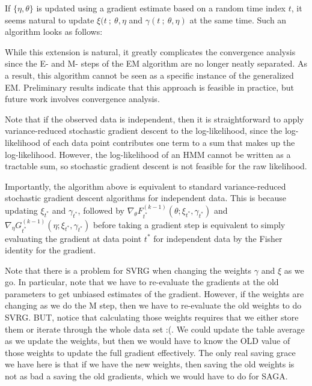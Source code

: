 If $\{\eta,\theta\}$ is updated using a gradient estimate based on a random time index $t$, it seems natural to update $\xi(t ~;~ \theta,\eta$ and $\gamma(t ~;~ \theta,\eta)$ at the same time. Such an algorithm looks as follows:

While this extension is natural, it greatly complicates the convergence analysis since the E- and M- steps of the EM algorithm are no longer neatly separated. As a result, this algorithm cannot be seen as a specific instance of the generalized EM. Preliminary results indicate that this approach is feasible in practice, but future work involves convergence analysis.

Note that if the observed data is independent, then it is straightforward to apply variance-reduced stochastic gradient descent to the log-likelihood, since the log-likelihood of each data point contributes one term to a sum that makes up the log-likelihood. However, the log-likelihood of an HMM cannot be written as a tractable sum, so stochastic gradient descent is not feasible for the raw likelihood. 

Importantly, the algorithm above is equivalent to standard variance-reduced stochastic gradient descent algorithms for independent data. This is because updating $\xi_{t^*}$ and $\gamma_{t^*}$, followed by $\nabla_{\theta} F^{(k-1)}_{t^*}(\theta;\xi_{t^*},\gamma_{t^*})$ and $\nabla_{\eta} G^{(k-1)}_{t^*}(\eta;\xi_{t^*},\gamma_{t^*})$ before taking a gradient step is equivalent to simply evaluating the gradient at data point $t^*$ for independent data by the Fisher identity for the gradient.

Note that there is a problem for SVRG when changing the weights $\gamma$ and $\xi$ as we go. In particular, note that we have to re-evaluate the gradients at the old parameters to get unbiased estimates of the gradient. However, if the weights are changing as we do the M step, then we have to re-evaluate the old weights to do SVRG. BUT, notice that calculating those weights requires that we either store them or iterate through the whole data set :(. We could update the table average as we update the weights, but then we would have to know the OLD value of those weights to update the full gradient effectively. The only real saving grace we have here is that if we have the new weights, then saving the old weights is not as bad a saving the old gradients, which we would have to do for SAGA.